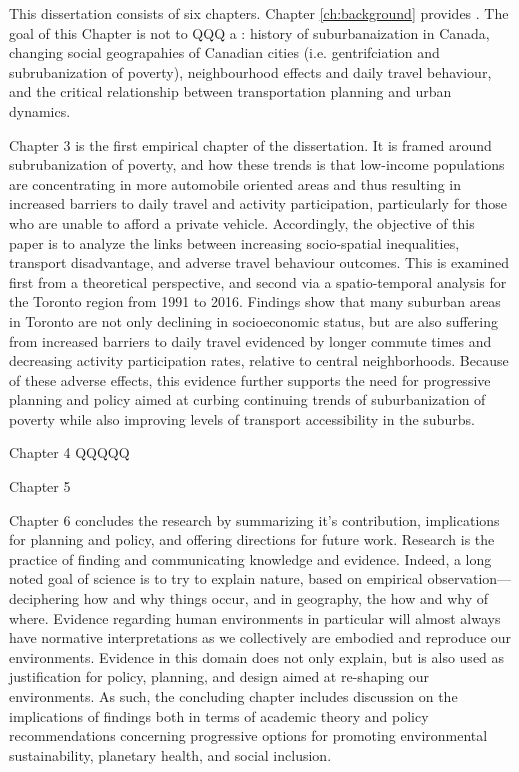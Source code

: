 This dissertation consists of six chapters. Chapter \ref{ch:background} provides . The goal of this Chapter is not to QQQ a : history of suburbanaization in Canada, changing social geograpahies of Canadian cities (i.e. gentrifciation and subrubanization of poverty), neighbourhood effects and daily travel behaviour, and the critical relationship between transportation planning and urban dynamics.

Chapter 3 is the first empirical chapter of the dissertation. It is framed around subrubanization of poverty, and how these trends is that low-income populations are concentrating in more automobile oriented areas and thus resulting in increased barriers to daily travel and activity participation, particularly for those who are unable to afford a private vehicle. Accordingly, the objective of this paper is to analyze the links between increasing socio-spatial inequalities, transport disadvantage, and adverse travel behaviour outcomes. This is examined first from a theoretical perspective, and second via a spatio-temporal analysis for the Toronto region from 1991 to 2016. Findings show that many suburban areas in Toronto are not only declining in socioeconomic status, but are also suffering from increased barriers to daily travel evidenced by longer commute times and decreasing activity participation rates, relative to central neighborhoods. Because of these adverse effects, this evidence further supports the need for progressive planning and policy aimed at curbing continuing trends of suburbanization of poverty while also improving levels of transport accessibility in the suburbs.

Chapter 4 QQQQQ

Chapter 5

Chapter 6 concludes the research by summarizing it's contribution, implications for planning and policy, and offering directions for future work. Research is the practice of finding and communicating knowledge and evidence. Indeed, a long noted goal of science is to try to explain nature, based on empirical observation---deciphering how and why things occur, and in geography, the how and why of where. Evidence regarding human environments in particular will almost always have normative interpretations as we collectively are embodied and reproduce our environments. Evidence in this domain does not only explain, but is also used as justification for policy, planning, and design aimed at re-shaping our environments. As such, the concluding chapter includes discussion on the implications of findings both in terms of academic theory and policy recommendations concerning progressive options for promoting environmental sustainability, planetary health, and social inclusion.


